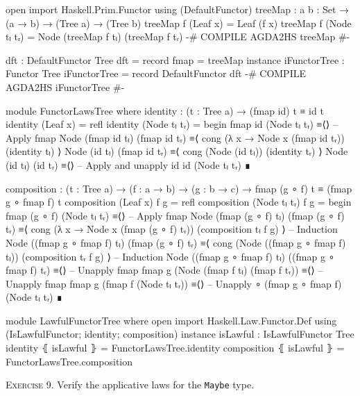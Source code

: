 \documentclass{article}
\begin{document}
\begin{code}
open import Haskell.Prim.Functor using (DefaultFunctor)
treeMap : {a b : Set} → (a → b) → (Tree a) → (Tree b)
treeMap f (Leaf x) = Leaf (f x)
treeMap f (Node tₗ tᵣ) = Node (treeMap f tₗ) (treeMap f tᵣ)
{-# COMPILE AGDA2HS treeMap #-}
\end{code}
\begin{code}
dft : DefaultFunctor Tree
dft = record { fmap = treeMap }
instance
  iFunctorTree : Functor Tree
  iFunctorTree = record { DefaultFunctor dft }
  {-# COMPILE AGDA2HS iFunctorTree #-}
\end{code}
\begin{code}
module FunctorLawsTree where
  identity : (t : Tree a) → (fmap id) t ≡ id t
  identity (Leaf x) = refl
  identity (Node tₗ tᵣ) =
    begin
      fmap id (Node tₗ tᵣ)
    ≡⟨⟩ -- Apply fmap
      Node (fmap id tₗ) (fmap id tᵣ)
    ≡⟨ cong (λ x → Node x (fmap id tᵣ)) (identity tₗ) ⟩
      Node (id tₗ) (fmap id tᵣ)
    ≡⟨ cong (Node (id tₗ)) (identity tᵣ) ⟩
      Node (id tₗ) (id tᵣ)
    ≡⟨⟩ -- Apply and unapply id
      id (Node tₗ tᵣ)
    ∎
\end{code}
\begin{code}
  composition : (t : Tree a) → (f : a → b) → (g : b → c)
    → fmap (g ∘ f) t ≡ (fmap g ∘ fmap f) t
  composition (Leaf x) f g = refl
  composition (Node tₗ tᵣ) f g =
    begin
      fmap (g ∘ f) (Node tₗ tᵣ)
    ≡⟨⟩ -- Apply fmap
      Node (fmap (g ∘ f) tₗ) (fmap (g ∘ f) tᵣ)
    ≡⟨ cong (λ x → Node x (fmap (g ∘ f) tᵣ)) (composition tₗ f g) ⟩ -- Induction
      Node ((fmap g ∘ fmap f) tₗ) (fmap (g ∘ f) tᵣ)
    ≡⟨ cong (Node ((fmap g ∘ fmap f) tₗ)) (composition tᵣ f g) ⟩ -- Induction
      Node ((fmap g ∘ fmap f) tₗ) ((fmap g ∘ fmap f) tᵣ)
    ≡⟨⟩ -- Unapply fmap
      fmap g (Node (fmap f tₗ) (fmap f tᵣ))
    ≡⟨⟩ -- Unapply fmap
      fmap g (fmap f (Node tₗ tᵣ))
    ≡⟨⟩ -- Unapply ∘
      (fmap g ∘ fmap f) (Node tₗ tᵣ)
    ∎
\end{code}
\begin{code}
module LawfulFunctorTree where
  open import Haskell.Law.Functor.Def
    using (IsLawfulFunctor; identity; composition)
  instance
    isLawful : IsLawfulFunctor Tree
    identity ⦃ isLawful ⦄ = FunctorLawsTree.identity
    composition ⦃ isLawful ⦄ = FunctorLawsTree.composition
\end{code}

\noindent
\textsc{Exercise 9.} Verify the applicative laws for the \texttt{Maybe} type.
\end{document}
